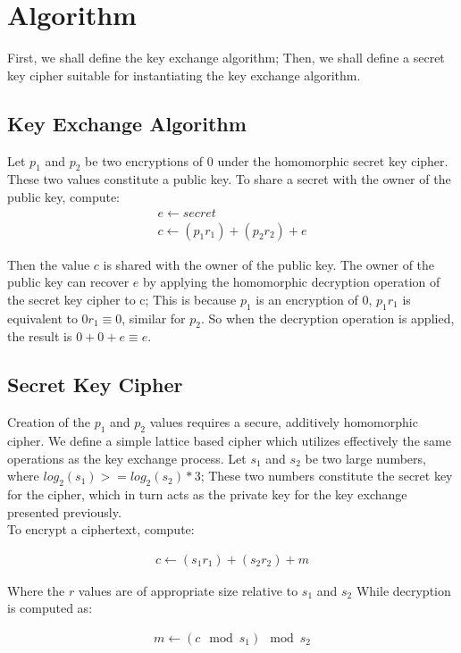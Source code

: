 \documentclass[preprint]{iacrtrans}
\begin{document}
\section{Algorithm}
First, we shall define the key exchange algorithm; Then, we shall define a secret key cipher suitable for instantiating the key exchange algorithm.

\subsection{Key Exchange Algorithm}
Let $p_1$ and $p_2$ be two encryptions of $0$ under the homomorphic secret key cipher. These two values constitute a public key. To share a secret with the owner of the public key, compute:
\begin{align}
    e \gets secret \\
    c \gets (p_1  r_1) + (p_2 r_2) + e
\end{align}

Then the value $c$ is shared with the owner of the public key. The owner of the public key can recover $e$ by applying the homomorphic decryption operation of the secret key cipher to c; This is because $p_1$ is an encryption of $0$, $p_1 r_1$ is equivalent to $0 r_1 \equiv 0$, similar for $p_2$. So when the decryption operation is applied, the result is $0 + 0 + e \equiv e$.

\subsection{Secret Key Cipher}
Creation of the $p_1$ and $p_2$ values requires a secure, additively homomorphic cipher. We define a simple lattice based cipher which utilizes effectively the same operations as the key exchange process. Let $s_1$ and $s_2$ be two large numbers, where $log_2(s_1) >= log_2(s_2) * 3$; These two numbers constitute the secret key for the cipher, which in turn acts as the private key for the key exchange presented previously.\\

To encrypt a ciphertext, compute:

\begin{align}
   c \gets (s_1 r_1) + (s_2 r_2) + m
\end{align}

Where the $r$ values are of appropriate size relative to $s_1$ and $s_2$ 
While decryption is computed as:

\begin{align}
    m \gets (c \mod s_1) \mod s_2
\end{align}
\end{document}
